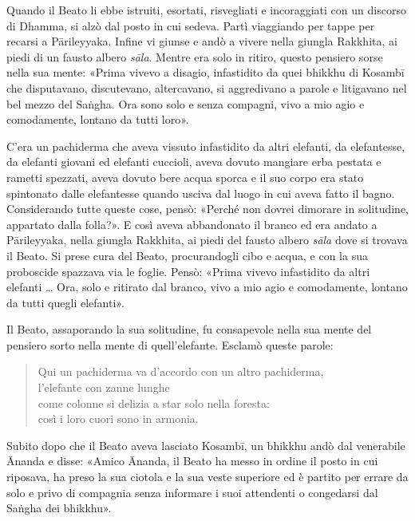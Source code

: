 
 Quando il Beato li ebbe istruiti, esortati, risvegliati e
incoraggiati con un discorso di Dhamma, si alzò dal posto in cui sedeva. Partì
viaggiando per tappe per recarsi a Pārileyyaka. Infine vi giunse e andò a vivere
nella giungla Rakkhita, ai piedi di un fausto albero \emph{sāla}. Mentre era
solo in ritiro, questo pensiero sorse nella sua mente: «Prima vivevo a disagio,
infastidito da quei bhikkhu di Kosambī che disputavano, discutevano,
altercavano, si aggredivano a parole e litigavano nel bel mezzo del Saṅgha. Ora
sono solo e senza compagni, vivo a mio agio e comodamente, lontano da tutti
loro».

C’era un pachiderma che aveva vissuto infastidito da altri elefanti, da
elefantesse, da elefanti giovani ed elefanti cuccioli, aveva dovuto mangiare
erba pestata e rametti spezzati, aveva dovuto bere acqua sporca e il suo corpo
era stato spintonato dalle elefantesse quando usciva dal luogo in cui aveva
fatto il bagno. Considerando tutte queste cose, pensò: «Perché non dovrei
dimorare in solitudine, appartato dalla folla?». E così aveva abbandonato il
branco ed era andato a Pārileyyaka, nella giungla Rakkhita, ai piedi del fausto
albero \emph{sāla} dove si trovava il Beato. Si prese cura del Beato,
procurandogli cibo e acqua, e con la sua proboscide spazzava via le foglie.
Pensò: «Prima vivevo infastidito da altri elefanti … Ora, solo e ritirato dal
branco, vivo a mio agio e comodamente, lontano da tutti quegli elefanti».

Il Beato, assaporando la sua solitudine, fu consapevole nella sua mente del
pensiero sorto nella mente di quell’elefante. Esclamò queste parole:

\begin{quote}
Qui un pachiderma va d’accordo con un altro pachiderma, \\
l’elefante con zanne lunghe \\
come colonne si delizia a star solo nella foresta: \\
così i loro cuori sono in armonia.
\end{quote}


 Subito dopo che il Beato aveva lasciato Kosambī, un bhikkhu
andò dal venerabile Ānanda e disse: «Amico Ānanda, il Beato ha messo in ordine
il posto in cui riposava, ha preso la sua ciotola e la sua veste superiore ed è
partito per errare da solo e privo di compagnia senza informare i suoi
attendenti o congedarsi dal Saṅgha dei bhikkhu».

